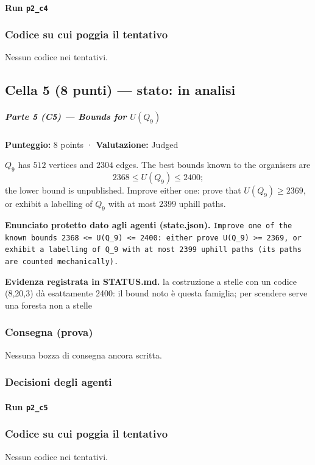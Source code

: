 \documentclass[11pt,a4paper]{article}
\begin{document}
\paragraph{Run \texttt{p2\_c4}}

\subsubsection{Codice su cui poggia il tentativo}
Nessun codice nei tentativi.

\subsection{Cella 5 (8 punti) — stato: in analisi}
\subparagraph{\texorpdfstring{Parte 5 (C5) --- Bounds for
\(U(Q_9)\)}{Parte 5 (C5) --- Bounds for U(Q\_9)}}\label{parte-5-c5-bounds-for-uq_9}

\textbf{Punteggio:} 8 points · \textbf{Valutazione:} Judged

\(Q_9\) has \(512\) vertices and \(2304\) edges. The best bounds known
to the organisers are \[
2368 \le U(Q_9) \le 2400;
\] the lower bound is unpublished. Improve either one: prove that
\(U(Q_9) \ge 2369\), or exhibit a labelling of \(Q_9\) with at most
\(2399\) uphill paths.

\textbf{Enunciato protetto dato agli agenti (state.json).} \texttt{Improve one of the known bounds 2368 \textless{}= U(Q\_9) \textless{}= 2400: either prove U(Q\_9) \textgreater{}= 2369, or exhibit a labelling of Q\_9 with at most 2399 uphill paths (its paths are counted mechanically).}

\textbf{Evidenza registrata in STATUS.md.} la costruzione a stelle con un codice (8,20,3) dà esattamente 2400: il bound noto è questa famiglia; per scendere serve una foresta non a stelle

\subsubsection{Consegna (prova)}
Nessuna bozza di consegna ancora scritta.

\subsubsection{Decisioni degli agenti}
\paragraph{Run \texttt{p2\_c5}}

\subsubsection{Codice su cui poggia il tentativo}
Nessun codice nei tentativi.
\end{document}
